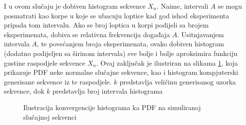 I u ovom slučaju je dobiven histogram sekvence $X_n$. Naime, intervali $A$ se
mogu posmatrati kao korpe u koje se ubacuju loptice kad god ishod eksperimenta
pripada tom intervalu. Ako se broj loptica u korpi podijeli sa brojem
eksperimenata, dobiva se relativna frekvencija događaja $A$. Usitnjavanjem
intervala $A$, te povećanjem broja eksperimenata, ovako dobiven histogram
(dodatno podijeljen sa širinom intervala) sve bolje i bolje aproksimira funkciju
gustine raspodjele sekvence $X_n$. Ovaj zaključak je ilustriran na slikama
\ref{fig:lln-hist}, koja prikazuje PDF neke normalne slučajne sekvence, kao i
histogram kompjuterski generisane sekvence iz te raspodjele. $k$ predstavlja
veličinu generisanog uzorka sekvence, dok $k$ predstavlja broj intervala
histograma

\begin{figure}[H]
  \centering
  \caption{Ilustracija konvergencije histograma ka PDF na simuliranoj slučajnoj
  sekvenci}
  \label{fig:lln-hist}
\end{figure}

